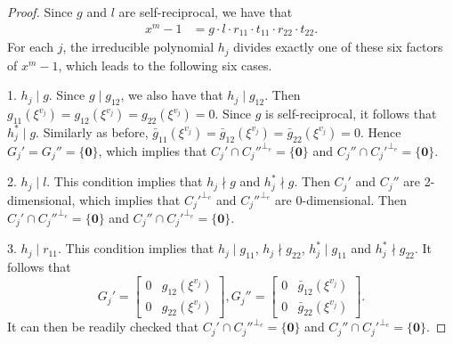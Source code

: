 \documentclass[10pt,a4paper]{amsart}
\begin{document}
\begin{proof} Since  $g$ and $l$ are self-reciprocal, we have that
\begin{align*}
x^m-1   &= g \cdot l \cdot r_{11} \cdot t_{11}     \cdot  r_{22} \cdot  t_{22}.
\end{align*}
For each $j$, the irreducible polynomial $h_j$ divides exactly one of these six factors of $x^m-1$, which leads to the following six cases.


1. $h_j \mid g$. Since $g \mid g_{12}$, we also have that $h_j \mid g_{12}$.  Then  
$g_{11}(\xi^{v_j})=g_{12}(\xi^{v_j})=g_{22}(\xi^{v_j})=0$. Since $g$ is self-reciprocal, it follows that $h_j^* \mid g$. Similarly as before,
$\bar{g}_{11}(\xi^{v_j})=\bar{g}_{12}(\xi^{v_j})=\bar{g}_{22}(\xi^{v_j})=0$.
Hence $G_j'=G_j''=\{\mathbf{0}\}$, which implies that  $C_j' \cap C_j''^{\perp_e} = \{\mathbf{0}\}$ and $C_j'' \cap C_j'^{\perp_e} = \{\mathbf{0}\}$.


2. $h_j \mid l$. This condition implies that $h_j \nmid g$ and $h_j^* \nmid g$. Then $C_j'$ and $C_j''$ are 2-dimensional, which implies that $C_j'^{\perp_e}$ and $C_j''^{\perp_e}$ are $0$-dimensional. Then $C_j' \cap C_j''^{\perp_e} = \{\mathbf{0}\}$ and $C_j'' \cap C_j'^{\perp_e} = \{\mathbf{0}\}$.

3. $h_j \mid r_{11}$. This condition implies that $h_j \mid g_{11}$, $h_j \nmid g_{22}$, $h_j^* \mid g_{11}$ and $h_j^* \nmid g_{22}$. It follows that  
$$
G_j'=   \begin{bmatrix}
0 & g_{12}(\xi^{v_j}) \\
0 & g_{22}(\xi^{v_j}) 
\end{bmatrix} ,
G_j''=   \begin{bmatrix}
0 & \bar{g}_{12}(\xi^{v_j}) \\
0 & \bar{g}_{22}(\xi^{v_j}) 
\end{bmatrix}.
$$
It can then be readily checked that $C_j' \cap C_j''^{\perp_e} = \{\mathbf{0}\}$ and $C_j'' \cap C_j'^{\perp_e} = \{\mathbf{0}\}$.


\end{proof}
\end{document}
